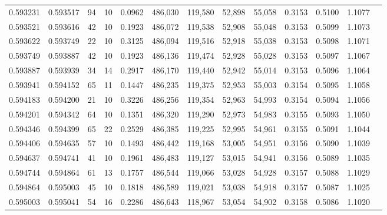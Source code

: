 \begin{tabular}{rrrrrrrrrrrrr}
0.593231 & 0.593517 &    94 &  10 &                                     0.0962 & 486,030 & 119,580 &  52,898 &  55,058 & 0.3153 & 0.5100 & 1.1077 \\
0.593521 & 0.593616 &    42 &  10 &                                     0.1923 & 486,072 & 119,538 &  52,908 &  55,048 & 0.3153 & 0.5099 & 1.1073 \\
0.593622 & 0.593749 &    22 &  10 &                                     0.3125 & 486,094 & 119,516 &  52,918 &  55,038 & 0.3153 & 0.5098 & 1.1071 \\
0.593749 & 0.593887 &    42 &  10 &                                     0.1923 & 486,136 & 119,474 &  52,928 &  55,028 & 0.3153 & 0.5097 & 1.1067 \\
0.593887 & 0.593939 &    34 &  14 &                                     0.2917 & 486,170 & 119,440 &  52,942 &  55,014 & 0.3153 & 0.5096 & 1.1064 \\
0.593941 & 0.594152 &    65 &  11 &                                     0.1447 & 486,235 & 119,375 &  52,953 &  55,003 & 0.3154 & 0.5095 & 1.1058 \\
0.594183 & 0.594200 &    21 &  10 &                                     0.3226 & 486,256 & 119,354 &  52,963 &  54,993 & 0.3154 & 0.5094 & 1.1056 \\
0.594201 & 0.594342 &    64 &  10 &                                     0.1351 & 486,320 & 119,290 &  52,973 &  54,983 & 0.3155 & 0.5093 & 1.1050 \\
0.594346 & 0.594399 &    65 &  22 &                                     0.2529 & 486,385 & 119,225 &  52,995 &  54,961 & 0.3155 & 0.5091 & 1.1044 \\
0.594406 & 0.594635 &    57 &  10 &                                     0.1493 & 486,442 & 119,168 &  53,005 &  54,951 & 0.3156 & 0.5090 & 1.1039 \\
0.594637 & 0.594741 &    41 &  10 &                                     0.1961 & 486,483 & 119,127 &  53,015 &  54,941 & 0.3156 & 0.5089 & 1.1035 \\
0.594744 & 0.594864 &    61 &  13 &                                     0.1757 & 486,544 & 119,066 &  53,028 &  54,928 & 0.3157 & 0.5088 & 1.1029 \\
0.594864 & 0.595003 &    45 &  10 &                                     0.1818 & 486,589 & 119,021 &  53,038 &  54,918 & 0.3157 & 0.5087 & 1.1025 \\
0.595003 & 0.595041 &    54 &  16 &                                     0.2286 & 486,643 & 118,967 &  53,054 &  54,902 & 0.3158 & 0.5086 & 1.1020 \\

\end{tabular}
